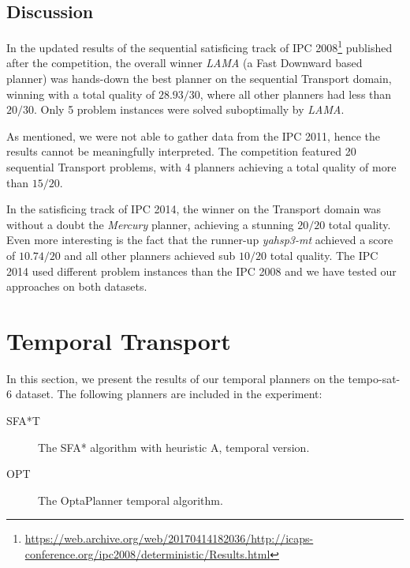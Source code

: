 \subsection{Discussion}

In the updated results of the sequential satisficing track of IPC 2008\footnote{\url{https://web.archive.org/web/20170414182036/http://icaps-conference.org/ipc2008/deterministic/Results.html}} published after the competition,
the overall winner \textit{LAMA} (a Fast Downward based planner)
was hands-down the best planner on the sequential Transport domain, winning
with a total quality of $28.93/30$, where all other planners had less than $20/30$.
Only 5 problem instances were solved suboptimally by \textit{LAMA}.

As mentioned, we were not able to gather data from the IPC 2011,
hence the results cannot be meaningfully interpreted.
The competition featured 20 sequential Transport problems,
with 4 planners achieving a total quality of more than $15/20$.

In the satisficing track of IPC 2014, the winner on the Transport domain
was without a doubt the \textit{Mercury} planner, achieving
a stunning $20/20$ total quality. Even more interesting is the fact that
the runner-up \textit{yahsp3-mt} achieved a score of $10.74/20$
and all other planners achieved sub $10/20$ total quality.
The IPC 2014 used different problem instances than the IPC 2008
and we have tested our approaches on both datasets.

 















\section{Temporal Transport}

In this section, we present the results of our temporal planners on the tempo-sat-6 dataset. The following planners are included in the experiment:
\begin{description}
\item[SFA*T] The SFA* algorithm with heuristic A, temporal version. 
\item[OPT] The OptaPlanner temporal algorithm. 
\end{description}

